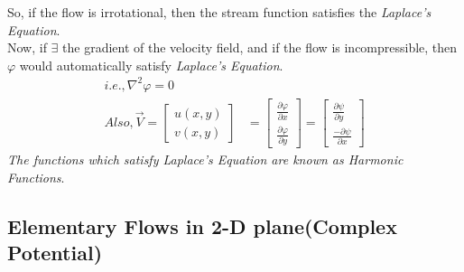 \documentclass{book}
\begin{document}
So, if the flow is irrotational, then the stream function satisfies the \emph{Laplace's Equation}.\\
Now, if $\exists$ the gradient of the velocity field, and if the flow is incompressible, then $\varphi$ would automatically satisfy \emph{Laplace's Equation}. 
\begin{equation*}
\begin{split}
i.e.,\nabla^2{\varphi}=0\\
Also, \vec{V}=\begin{bmatrix}u(x,y)\\v(x,y)\end{bmatrix}&=\begin{bmatrix}\frac{\partial \varphi}{\partial x}\\[0.3cm]\frac{\partial \varphi}{\partial y}\end{bmatrix}=\begin{bmatrix}\frac{\partial \psi}{\partial y}\\[0.3cm]\frac{-\partial \psi}{\partial x}\end{bmatrix}
\end{split}
\end{equation*}
\emph{The functions which satisfy Laplace's Equation are known as Harmonic Functions}.
\subsection{Elementary Flows in 2-D plane(Complex Potential)}
\end{document}
